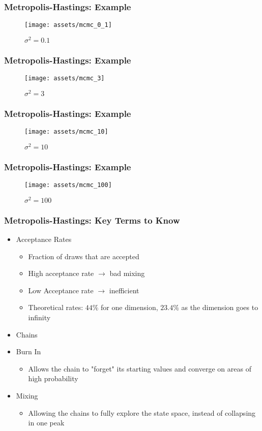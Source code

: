 \documentclass{beamer}
\begin{document}
\begin{frame}
  \frametitle{Metropolis-Hastings: Example}
  \begin{figure}
    \centering
    \texttt{[image: assets/mcmc\_0\_1]}
    \caption{$\sigma^2 = 0.1$}
  \end{figure}
\end{frame}

\begin{frame}
  \frametitle{Metropolis-Hastings: Example}
  \begin{figure}
    \centering
    \texttt{[image: assets/mcmc\_3]}
    \caption{$\sigma^2 = 3$}
  \end{figure}
\end{frame}

\begin{frame}
  \frametitle{Metropolis-Hastings: Example}
  \begin{figure}
    \centering
    \texttt{[image: assets/mcmc\_10]}
    \caption{$\sigma^2 = 10$}
  \end{figure}
\end{frame}

\begin{frame}
  \frametitle{Metropolis-Hastings: Example}
  \begin{figure}
    \centering
    \texttt{[image: assets/mcmc\_100]}
    \caption{$\sigma^2 = 100$}
  \end{figure}
\end{frame}


\begin{frame}
\frametitle{Metropolis-Hastings: Key Terms to Know}
\begin{itemize}
  \item Acceptance Rates
  \begin{itemize}
    \item Fraction of draws that are accepted
    \item High acceptance rate $\rightarrow$ bad mixing
    \item Low Acceptance rate $\rightarrow$ inefficient
    \item Theoretical rates: $44\%$ for one dimension, $23.4\%$ as the dimension goes to infinity
  \end{itemize}
  \item Chains
  \item Burn In
  \begin{itemize}
    \item Allows the chain to "forget" its starting values and converge on areas of high probability
  \end{itemize}
  \item Mixing
  \begin{itemize}
    \item Allowing the chains to fully explore the state space, instead of collapsing
    in one peak
  \end{itemize}
\end{itemize}
\end{frame}
\end{document}
